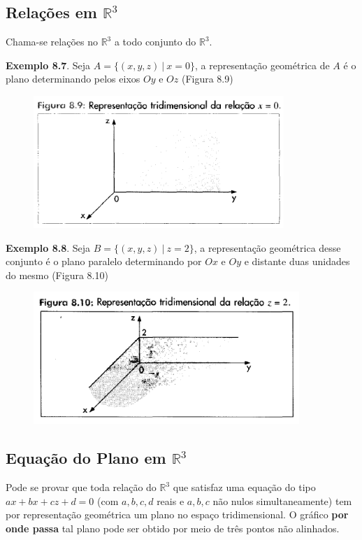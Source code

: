 	\subsection{Relações em $\mathbb{R}^{3}$ \cite{morettin}}

		Chama-se relações no $\mathbb{R}^{3}$ a todo conjunto do $\mathbb{R}^{3}$.

		\bigskip

		\textbf{Exemplo 8.7}. Seja $A = \{(x, y, z) \ | \ x = 0 \}$, a representação geométrica de $A$ é o plano determinando pelos eixos $Oy$ e $Oz$ (Figura 8.9)

		\begin{figure}[H]
			\includegraphics[height=5cm]{images/morettin_figura-8-9}
		\end{figure}

		\textbf{Exemplo 8.8}. Seja $B = \{(x, y, z) \ | \ z = 2 \}$, a representação geométrica desse conjunto é o plano paralelo determinando por $Ox$ e $Oy$ e distante duas unidades do mesmo (Figura 8.10)

		\begin{figure}[H]
			\includegraphics[height=5cm]{images/morettin_figura-8-10}
		\end{figure}

	\subsection{Equação do Plano em $\mathbb{R}^{3}$ \cite{morettin}}

		Pode se provar que toda relação do $\mathbb{R}^{3}$ que satisfaz uma equação do tipo $ax + bx + cz + d = 0$ (com $a, b, c, d$ reais e $a, b, c$ não nulos simultaneamente) tem por representação geométrica um plano no espaço tridimensional. O gráfico \textbf{por onde passa} tal plano pode ser obtido por meio de três pontos não alinhados.

